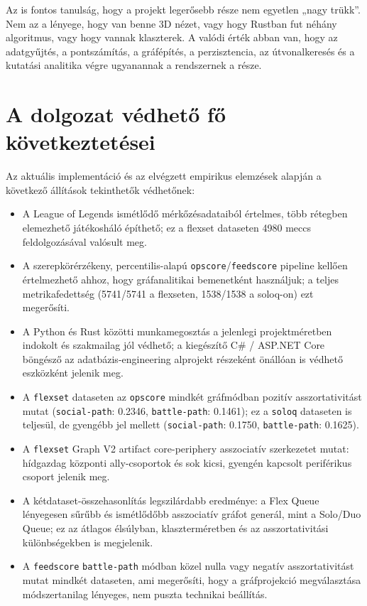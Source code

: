 ﻿\documentclass[a4paper,12pt]{report}
\begin{document}
Az is fontos tanulság, hogy a projekt legerősebb része nem egyetlen „nagy trükk”. Nem az a lényege, hogy van benne 3D nézet, vagy hogy Rustban fut néhány algoritmus, vagy hogy vannak klaszterek. A valódi érték abban van, hogy az adatgyűjtés, a pontszámítás, a gráfépítés, a perzisztencia, az útvonalkeresés és a kutatási analitika végre ugyanannak a rendszernek a része.

\section{A dolgozat védhető fő következtetései}

Az aktuális implementáció és az elvégzett empirikus elemzések alapján a következő állítások tekinthetők védhetőnek:

\begin{itemize}
    \item A League of Legends ismétlődő mérkőzésadataiból értelmes, több rétegben elemezhető játékosháló építhető; ez a flexset dataseten 4980 meccs feldolgozásával valósult meg.
    \item A szerepkörérzékeny, percentilis-alapú \texttt{opscore}/\texttt{feedscore} pipeline kellően értelmezhető ahhoz, hogy gráfanalitikai bemenetként használjuk; a teljes metrikafedettség (5741/5741 a flexseten, 1538/1538 a soloq-on) ezt megerősíti.
    \item A Python és Rust közötti munkamegosztás a jelenlegi projektméretben indokolt és szakmailag jól védhető; a kiegészítő C\# / ASP.NET Core böngésző az adatbázis-engineering alprojekt részeként önállóan is védhető eszközként jelenik meg.
    \item A \texttt{flexset} dataseten az \texttt{opscore} mindkét gráfmódban pozitív asszortativitást mutat (\texttt{social-path}: 0.2346, \texttt{battle-path}: 0.1461); ez a \texttt{soloq} dataseten is teljesül, de gyengébb jel mellett (\texttt{social-path}: 0.1750, \texttt{battle-path}: 0.1625).
    \item A \texttt{flexset} Graph V2 artifact core-periphery asszociatív szerkezetet mutat: hídgazdag központi ally-csoportok és sok kicsi, gyengén kapcsolt periférikus csoport jelenik meg.
    \item A kétdataset-összehasonlítás legszilárdabb eredménye: a Flex Queue lényegesen sűrűbb és ismétlődőbb asszociatív gráfot generál, mint a Solo/Duo Queue; ez az átlagos élsúlyban, klaszterméretben és az asszortativitási különbségekben is megjelenik.
    \item A \texttt{feedscore} \texttt{battle-path} módban közel nulla vagy negatív asszortativitást mutat mindkét dataseten, ami megerősíti, hogy a gráfprojekció megválasztása módszertanilag lényeges, nem puszta technikai beállítás.
\end{itemize}
\end{document}
